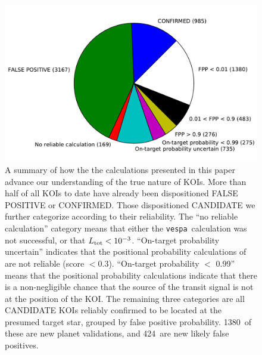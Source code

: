 \documentclass{emulateapj}
\newcommand{\figlabel}[1]{\label{fig:#1}}
\newcommand{\nvalnew}{1380}
\newcommand{\nfpnew}{424}
\newcommand{\posprobthresh}{0.3}
\newcommand{\vespa}{\texttt{vespa}}
\begin{document}
\begin{figure}[p]
\begin{center}
\includegraphics[width=7in]{figures/fpp_pie.pdf}
\end{center}
\caption{A summary of how the the calculations presented in this paper
  advance our understanding of the true nature of KOIs.  More than
  half of all KOIs to date have already been dispositioned FALSE
  POSITIVE or CONFIRMED.  Those dispositioned CANDIDATE we further
  categorize according to their reliability.  The ``no reliable
  calculation'' category means that either the \vespa\ calculation was
  not successful, or that $L_{\rm tot} < 10^{-3}$.  ``On-target
  probability uncertain'' indicates that the positional probability
  calculations of \citet{Bryson:KSCI} are not reliable (score $<
  \posprobthresh$).  ``On-target probability $<$ 0.99'' means that the positional
  probability calculations indicate that there is a non-negligible
  chance that the source of the transit signal is not at the position
  of the KOI.  The remaining three categories are all CANDIDATE KOIs
  reliably confirmed to be located at the presumed target star,
  grouped by false positive probability.  \nvalnew\ of these are new
  planet validations, and \nfpnew\ are new likely false positives.
  \figlabel{fpppie}}
\end{figure}
\end{document}
